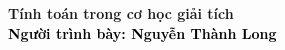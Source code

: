 \begin{frame}[noframenumbering]
    \thispagestyle{empty}
    \bfseries
    \begin{flushleft}
        \vfill
        \vspace{5mm}
        \textcolor{BlueDefault}{\huge \bfseries Tính toán trong cơ học giải tích} \\
        \vspace{10mm}
        \textcolor{black}{\large \bfseries Người trình bày: Nguyễn Thành Long}
        \vfill
    \end{flushleft}
\end{frame}